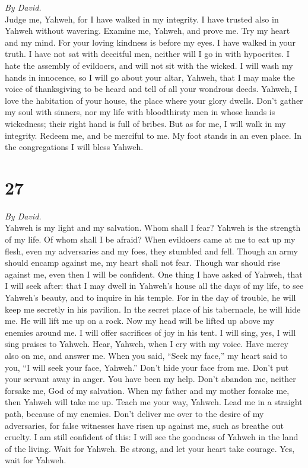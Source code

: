 \emph{By David.}\\
 Judge me, Yahweh, for I have walked in my integrity. I
have trusted also in Yahweh without wavering.  Examine me,
Yahweh, and prove me. Try my heart and my mind.  For your
loving kindness is before my eyes. I have walked in your truth.
 I have not sat with deceitful men, neither will I go in
with hypocrites.  I hate the assembly of evildoers, and
will not sit with the wicked.  I will wash my hands in
innocence, so I will go about your altar, Yahweh,  that I
may make the voice of thanksgiving to be heard and tell of all your
wondrous deeds.  Yahweh, I love the habitation of your
house, the place where your glory dwells.  Don't gather my
soul with sinners, nor my life with bloodthirsty men  in
whose hands is wickedness; their right hand is full of bribes.
 But as for me, I will walk in my integrity. Redeem me,
and be merciful to me.  My foot stands in an even place.
In the congregations I will bless Yahweh.

\hypertarget{section-26}{%
\section{27}\label{section-26}}

\emph{By David.}\\
 Yahweh is my light and my salvation. Whom shall I fear?
Yahweh is the strength of my life. Of whom shall I be afraid?
 When evildoers came at me to eat up my flesh, even my
adversaries and my foes, they stumbled and fell.  Though
an army should encamp against me, my heart shall not fear. Though war
should rise against me, even then I will be confident. 
One thing I have asked of Yahweh, that I will seek after: that I may
dwell in Yahweh's house all the days of my life, to see Yahweh's beauty,
and to inquire in his temple.  For in the day of trouble,
he will keep me secretly in his pavilion. In the secret place of his
tabernacle, he will hide me. He will lift me up on a rock.
 Now my head will be lifted up above my enemies around me.
I will offer sacrifices of joy in his tent. I will sing, yes, I will
sing praises to Yahweh.  Hear, Yahweh, when I cry with my
voice. Have mercy also on me, and answer me.  When you
said, ``Seek my face,'' my heart said to you, ``I will seek your face,
Yahweh.''  Don't hide your face from me. Don't put your
servant away in anger. You have been my help. Don't abandon me, neither
forsake me, God of my salvation.  When my father and my
mother forsake me, then Yahweh will take me up.  Teach me
your way, Yahweh. Lead me in a straight path, because of my enemies.
 Don't deliver me over to the desire of my adversaries,
for false witnesses have risen up against me, such as breathe out
cruelty.  I am still confident of this: I will see the
goodness of Yahweh in the land of the living.  Wait for
Yahweh. Be strong, and let your heart take courage. Yes, wait for
Yahweh.

